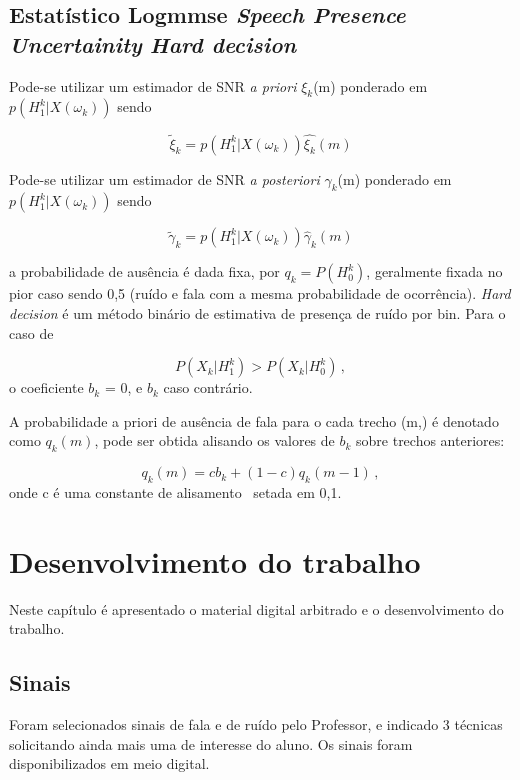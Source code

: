 \section{Estatístico Logmmse \textit{Speech Presence Uncertainity} \textit{Hard decision} }

Pode-se utilizar um estimador de SNR \textit{a priori} $\xi_k$(m) ponderado em $p(H_1^k|X(\omega_k))$ sendo

\begin{equation}
\tilde{\xi}_k = p(H_1^k|X(\omega_k))\hat{\xi_k}(m)    
\end{equation}

Pode-se utilizar um estimador de SNR \textit{a posteriori} $\gamma_k$(m) ponderado em $p(H_1^k|X(\omega_k))$ sendo

\begin{equation}
\tilde{\gamma}_k = p(H_1^k|X(\omega_k))\hat{\gamma}_k(m)    
\end{equation}

a probabilidade de ausência é dada fixa, por $q_k = P(H_0^k)$, geralmente fixada no pior caso sendo 0,5 (ruído e fala com a mesma probabilidade de ocorrência). \textit{Hard decision} é um método binário de estimativa de presença de ruído por bin. Para o caso de

\begin{equation}
P(X_k|H_1^k)>P(X_k|H_0^k) \,,
\end{equation}
\noindent
o coeficiente $b_k$ = 0, e $b_k$ caso contrário. 

 A probabilidade a priori de ausência de fala para o cada trecho (m,) é denotado como $q_k(m)$, pode ser obtida alisando os valores de $b_k$ sobre trechos anteriores:
 
 \begin{equation}
 q_k(m) = cb_k+(1-c)q_k(m-1)\,,
  \end{equation}
\noindent
onde c é uma constante de alisamento~\cite{loizou2013speech} setada em 0,1.

\chapter{Desenvolvimento do trabalho}
Neste capítulo é apresentado o material digital arbitrado e o desenvolvimento do trabalho.
\section{Sinais}
Foram selecionados sinais de fala e de ruído pelo Professor, e indicado 3 técnicas solicitando ainda mais uma de interesse do aluno. Os sinais foram disponibilizados em meio digital.

